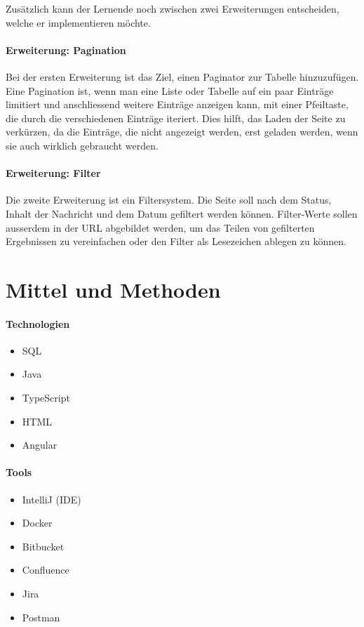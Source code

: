 Zusätzlich kann der Lernende noch zwischen zwei Erweiterungen entscheiden, welche er implementieren möchte.

\paragraph{Erweiterung: Pagination}
Bei der ersten Erweiterung ist das Ziel, einen Paginator zur Tabelle hinzuzufügen. Eine Pagination ist, wenn man eine Liste oder Tabelle auf ein paar Einträge limitiert und anschliessend weitere Einträge anzeigen kann, mit einer Pfeiltaste, die durch die verschiedenen Einträge iteriert. Dies hilft, das Laden der Seite zu verkürzen, da die Einträge, die nicht angezeigt werden, erst geladen werden, wenn sie auch wirklich gebraucht werden.

\paragraph{Erweiterung: Filter}
Die zweite Erweiterung ist ein Filtersystem. Die Seite soll nach dem Status, Inhalt der Nachricht und dem Datum gefiltert werden können. Filter-Werte sollen ausserdem in der URL abgebildet werden, um das Teilen von gefilterten Ergebnissen zu vereinfachen oder den Filter als Lesezeichen ablegen zu können.

\section{Mittel und Methoden}\label{sec:mittel-und-methoden}

\paragraph{Technologien}
\begin{itemize}
	\item SQL
    \item Java
    \item TypeScript
    \item HTML
    \item Angular
\end{itemize}

\paragraph{Tools}
\begin{itemize}
	\item IntelliJ (IDE)
    \item Docker
	\item Bitbucket
	\item Confluence
	\item Jira
	\item Postman
\end{itemize}

